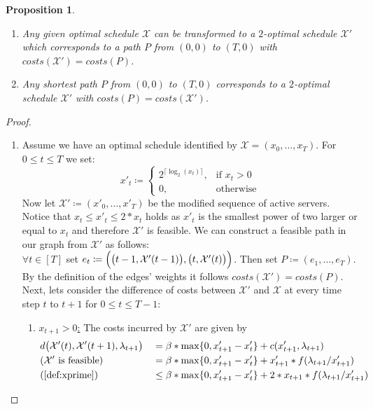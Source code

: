 \documentclass[hidelinks]{article}
\theoremstyle{plain}
\newtheorem{prop}[thm]{Proposition}
\theoremstyle{definition}
\theoremstyle{rem}
\newcommand{\mx}{\mathcal{X}}
\begin{document}
\begin{sloppypar}
\begin{prop}
$ $
\begin{enumerate}
	\item\label{prop:2opt} Any given optimal schedule $\mx$ can be transformed to a $2$-optimal schedule $\mx'$ which corresponds to a path $P$ from $(0,0)$ to $(T,0)$ with $costs(\mx')=costs(P)$.
	\item Any shortest path $P$ from $(0,0)$ to $(T,0)$ corresponds to a $2$-optimal schedule $\mx'$ with $costs(P)=costs(\mx')$.
\end{enumerate}
\end{prop}
\begin{proof}
$ $
\begin{enumerate}
	\item Assume we have an optimal schedule identified by $\mx=(x_0,\ldots,x_T)$. For $0\le t\le T$ we set:
	\begin{equation}
		x'_t\coloneqq 
		\begin{cases}
		  2^{\lceil\log_2(x_t)\rceil}, & \text{if $x_t>0$}\\
		  0, & \text{otherwise}
		\end{cases} \label{def:xprime}
	\end{equation}
	Now let $\mx'\coloneqq(x'_0,\ldots,x'_T)$ be the modified sequence of active servers. Notice that $x_t\le x'_t\le 2*x_t$ holds as $x'_t$ is the smallest power of two larger or equal to $x_t$ and therefore $\mx'$ is feasible. We can construct a feasible path in our graph from $\mathcal{X'}$ as follows:\\
	$\forall t\in[T]$ set $e_t\coloneqq\Bigl(\bigl(t-1,\mx'(t-1)\bigr),\bigl(t,\mx'(t)\bigr)\Bigr)$. Then set $P\coloneqq(e_1,\ldots,e_{T})$. By the definition of the edges' weights it follows $costs(\mx')=costs(P)$.\\
		Next, lets consider the difference of costs between $\mx'$ and $\mx$ at every time step $t$ to $t+1$ for $0\le t\le T-1$:
	\begin{enumerate}
		\item \underline{$x_{t+1}>0$:}
		The costs incurred by $\mx'$ are given by
		\begin{alignat}{2}
			&d\bigl(\mx'(t),\mx'(t+1),\lambda_{t+1}\bigr)&&=\beta*\max\{0,x'_{t+1}-x'_t\}+c(x'_{t+1},\lambda_{t+1})\nonumber\\
			&\text{($\mx'$ is feasible)}	&&=\beta*\max\{0,x'_{t+1}-x'_t\}+x'_{t+1}*f(\lambda_{t+1}/x'_{t+1})\nonumber\\
			&\text(\ref{def:xprime}) &&\le\beta*\max\{0,x'_{t+1}-x'_t\}+2*x_{t+1}*f(\lambda_{t+1}/x'_{t+1})\nonumber\\

\end{alignat}
\end{enumerate}
\end{enumerate}
\end{proof}
\end{sloppypar}
\end{document}
